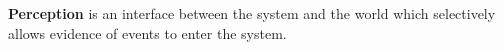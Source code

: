 

\begin{defn}%
\label{def:perception}
\hypertarget{def:perception}{}\textbf{Perception} is an interface
between the system and the world which selectively allows evidence of events to
enter the system.
\end{defn}



